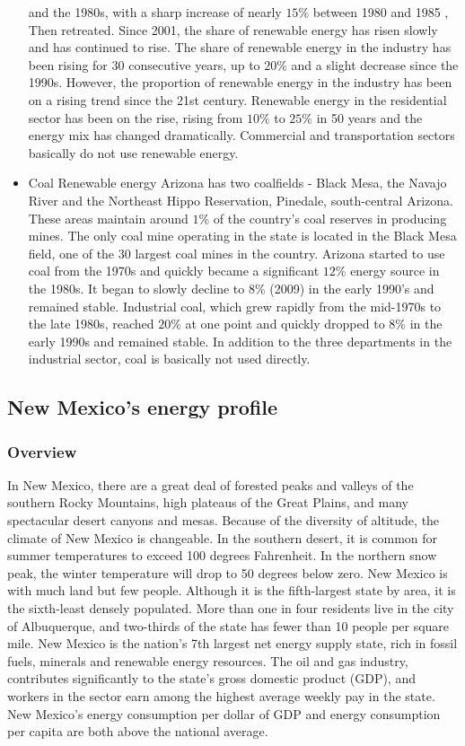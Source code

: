 \documentclass{mcmthesis}
\begin{document}
\begin{itemize}
  and the 1980s, with a sharp increase of nearly $15\%$ between 1980 and 1985 , Then retreated. Since 2001, the share of renewable energy has risen
  slowly and has continued to rise. The share of renewable energy in the industry has been rising for 30 consecutive years, up to $20\%$ and
  a slight decrease since the 1990s. However, the proportion of renewable energy in the industry has been on a rising trend since the 21st century.
  Renewable energy in the residential sector has been on the rise, rising from $10\%$ to $25\%$ in 50 years and the energy mix has changed dramatically.
  Commercial and transportation sectors basically do not use renewable energy.
  \item Coal
  Renewable energy Arizona has two coalfields - Black Mesa, the Navajo River and the Northeast Hippo Reservation, Pinedale, south-central Arizona.
  These areas maintain around $1\%$ of the country's coal reserves in producing mines. The only coal mine operating in the state is located in the Black
  Mesa field, one of the 30 largest coal mines in the country. Arizona started to use coal from the 1970s and quickly became a significant $12\%$ energy
  source in the 1980s. It began to slowly decline to $8\%$ (2009) in the early 1990's and remained stable. Industrial coal,
  which grew rapidly from the mid-1970s to the late 1980s, reached $20\%$ at one point and quickly dropped to $8\%$ in the early 1990s and remained stable.
  In addition to the three departments in the industrial sector, coal is basically not used directly.
\end{itemize}

\subsection{New Mexico's energy profile}
\subsubsection{Overview}
In New Mexico, there are a great deal of forested peaks and valleys of the southern Rocky Mountains, high plateaus of the Great Plains, and many spectacular desert canyons and mesas. Because of the diversity of altitude, the climate of New Mexico is changeable. In the southern desert, it is common for summer temperatures to exceed 100 degrees Fahrenheit. In the northern snow peak, the winter temperature will drop to 50 degrees below zero. New Mexico is with much land but few people. Although it is the fifth-largest state by area, it is the sixth-least densely populated. More than one in four residents live in the city of Albuquerque, and two-thirds of the state has fewer than 10 people per square mile. New Mexico is the nation's 7th largest net energy supply state, rich in fossil fuels, minerals and renewable energy resources. The oil and gas industry, contributes significantly to the state's gross domestic product (GDP), and workers in the sector earn among the highest average weekly pay in the state. New Mexico's energy consumption per dollar of GDP and energy consumption per capita are both above the national average.
\end{document}
